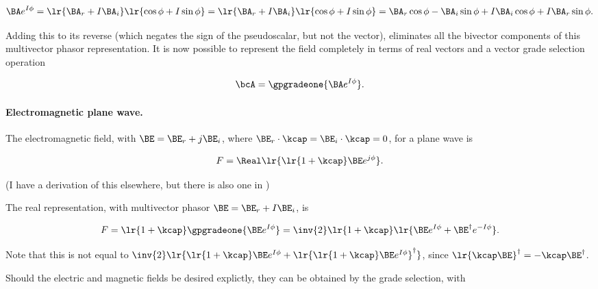 \begin{dmath}\label{eqn:ellipticalWaves:80}
\BA e^{I \phi}
=
\lr{ \BA_r + I \BA_i }
\lr{ \cos\phi + I \sin\phi }
=
\lr{ \BA_r + I \BA_i }
\lr{ \cos\phi + I \sin\phi }
=
\BA_r \cos\phi - \BA_i \sin\phi
+ I \BA_i \cos\phi + I \BA_r \sin\phi.
\end{dmath}

Adding this to its reverse (which negates the sign of the pseudoscalar, but not the vector), eliminates all the bivector components of this multivector phasor representation.  It is now possible to represent the field completely in terms of real vectors and a vector grade selection operation

\begin{dmath}\label{eqn:ellipticalWaves:100}
\bcA = \gpgradeone{ \BA e^{I \phi } }.
\end{dmath}

\paragraph{Electromagnetic plane wave.}

The electromagnetic field, with \( \BE = \BE_r + j \BE_i \), where \( \BE_r \cdot \kcap = \BE_i \cdot \kcap = 0 \), for a plane wave is

\begin{dmath}\label{eqn:ellipticalWaves:140}
   F = \Real \lr{ \lr{ 1 + \kcap } \BE e^{j \phi} }.
\end{dmath}

(I have a derivation of this elsewhere, but there is also one in \citep{doran2003gap})

The real representation, with multivector phasor \( \BE = \BE_r + I \BE_i \), is

\begin{dmath}\label{eqn:ellipticalWaves:160}
F
=
\lr{ 1 + \kcap } \gpgradeone{ \BE e^{I \phi } }
=
\inv{2} \lr{ 1 + \kcap } \lr{ \BE e^{I \phi } + \BE^\dagger e^{-I \phi } }.
\end{dmath}

Note that this is not equal to \(
\inv{2} \lr{
   \lr{ 1 + \kcap } \BE e^{I \phi }
   +
\lr{ \lr{ 1 + \kcap } \BE e^{I \phi } }^\dagger } \), since \( \lr{ \kcap \BE }^\dagger = -\kcap \BE^\dagger \).

Should the electric and magnetic fields be desired explictly, they can be obtained by the grade selection, with

